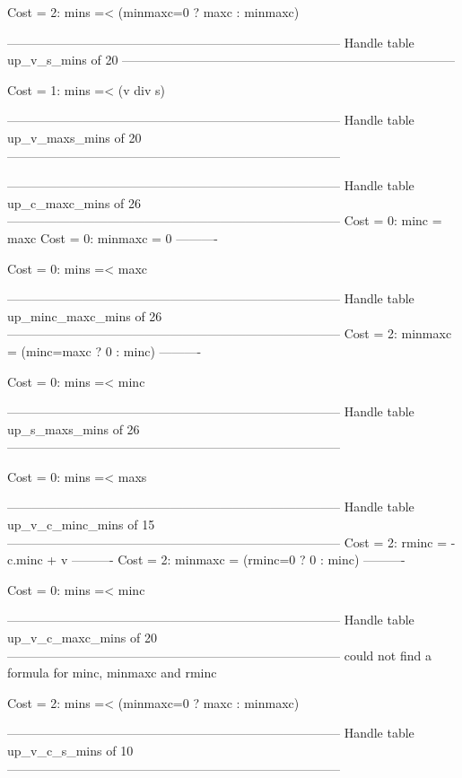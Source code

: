 Cost =  2:  mins =< (minmaxc=0 ? maxc : minmaxc)

--------------------------------------------------------------------------------
Handle table up_v_s_mins of 20
--------------------------------------------------------------------------------

Cost =  1:  mins =< (v div s)

--------------------------------------------------------------------------------
Handle table up_v_maxs_mins of 20
--------------------------------------------------------------------------------


--------------------------------------------------------------------------------
Handle table up_c_maxc_mins of 26
--------------------------------------------------------------------------------
Cost =  0:  minc    = maxc
Cost =  0:  minmaxc = 0
----------

Cost =  0:  mins =< maxc

--------------------------------------------------------------------------------
Handle table up_minc_maxc_mins of 26
--------------------------------------------------------------------------------
Cost =  2:  minmaxc = (minc=maxc ? 0 : minc)
----------

Cost =  0:  mins =< minc

--------------------------------------------------------------------------------
Handle table up_s_maxs_mins of 26
--------------------------------------------------------------------------------

Cost =  0:  mins =< maxs

--------------------------------------------------------------------------------
Handle table up_v_c_minc_mins of 15
--------------------------------------------------------------------------------
Cost =  2:  rminc   = -c.minc + v
----------
Cost =  2:  minmaxc = (rminc=0 ? 0 : minc)
----------

Cost =  0:  mins =< minc

--------------------------------------------------------------------------------
Handle table up_v_c_maxc_mins of 20
--------------------------------------------------------------------------------
could not find a formula for minc, minmaxc and rminc

Cost =  2:  mins =< (minmaxc=0 ? maxc : minmaxc)

--------------------------------------------------------------------------------
Handle table up_v_c_s_mins of 10
--------------------------------------------------------------------------------

